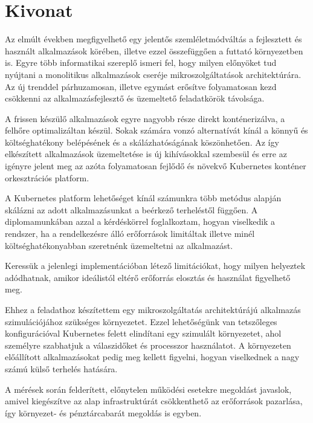 \setcounter{page}{1}

\selecthungarian

\chapter*{Kivonat}

Az elmúlt években megfigyelhető egy jelentős szemléletmódváltás a fejlesztett és használt alkalmazások körében, illetve ezzel összefüggően a futtató környezetben is.
Egyre több informatikai szereplő ismeri fel, hogy milyen előnyöket tud nyújtani a monolitikus alkalmazások cseréje mikroszolgáltatások architektúrára.
Az új trenddel párhuzamosan, illetve egymást erősítve folyamatosan kezd csökkenni az alkalmazásfejlesztő és üzemeltető feladatkörök távolsága.

A frissen készülő alkalmazások egyre nagyobb része direkt konténerizálva, a felhőre optimalizáltan készül.
Sokak számára vonzó alternatívát kínál a könnyű és költséghatékony belépésének és a skálázhatóságának köszönhetően.
Az így elkészített alkalmazások üzemeltetése is új kihívásokkal szembesül és erre az igényre jelent meg az azóta folyamatosan fejlődő és növekvő Kubernetes konténer orkesztrációs platform.

A Kubernetes platform lehetőséget kínál számunkra több metódus alapján skálázni az adott alkalmazásunkat a beérkező terheléstől függően.
A diplomamunkában azzal a kérdéskörrel foglalkoztam, hogyan viselkedik a rendszer, ha a rendelkezésre álló erőforrások limitáltak illetve minél költséghatékonyabban szeretnénk üzemeltetni az alkalmazást. 

Keressük a jelenlegi implementációban létező limitációkat, hogy milyen helyeztek adódhatnak, amikor ideálistól eltérő erőforrás elosztás és használat figyelhető meg.

Ehhez a feladathoz készítettem egy mikroszolgáltatás architektúrájú alkalmazás szimulációjához szükséges környezetet. Ezzel lehetőségünk van tetszőleges konfigurációval Kubernetes felett elindítani egy szimulált környezetet, ahol személyre szabhatjuk a válaszidőket és processzor használatot.
A környezeten előállított alkalmazásokat pedig meg kellett figyelni, hogyan viselkednek a nagy számú külső terhelés hatására.

A mérések során felderített, előnytelen működési esetekre megoldást javaslok, amivel kiegészítve az alap infrastruktúrát csökkenthető az erőforrások pazarlása, így környezet- és pénztárcabarát megoldás is egyben.


